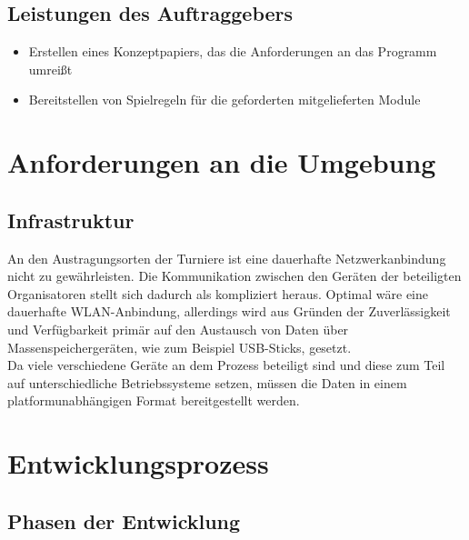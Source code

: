 \documentclass[11pt]{article}
\begin{document}
\subsection{Leistungen des Auftraggebers}

\begin{itemize}
	\item Erstellen eines Konzeptpapiers, das die Anforderungen an das Programm umreißt
	\item Bereitstellen von Spielregeln für die geforderten mitgelieferten Module
\end{itemize}

\section{Anforderungen an die Umgebung}

\subsection{Infrastruktur}

An den Austragungsorten der Turniere ist eine dauerhafte Netzwerkanbindung nicht zu gewährleisten. Die Kommunikation zwischen den Geräten der beteiligten Organisatoren stellt sich dadurch als kompliziert heraus. Optimal wäre eine dauerhafte WLAN-Anbindung, allerdings wird aus Gründen der Zuverlässigkeit und Verfügbarkeit primär auf den Austausch von Daten über Massenspeichergeräten, wie zum Beispiel USB-Sticks, gesetzt.\\
Da viele verschiedene Geräte an dem Prozess beteiligt sind und diese zum Teil auf unterschiedliche Betriebssysteme setzen, müssen die Daten in einem platformunabhängigen Format bereitgestellt werden.

\section{Entwicklungsprozess}

\subsection{Phasen der Entwicklung}
\end{document}
